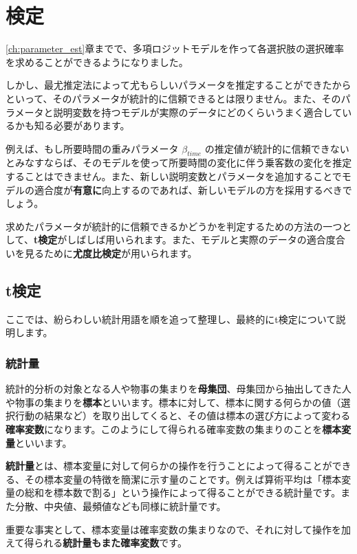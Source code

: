\chapter{検定}\label{ch:testing}

\ref{ch:parameter_est}章までで、多項ロジットモデルを作って各選択肢の選択確率を求めることができるようになりました。

しかし、最尤推定法によって尤もらしいパラメータを推定することができたからといって、そのパラメータが統計的に信頼できるとは限りません。また、そのパラメータと説明変数を持つモデルが実際のデータにどのくらいうまく適合しているかも知る必要があります。

例えば、もし所要時間の重みパラメータ $\beta_{time}$ の推定値が統計的に信頼できないとみなすならば、そのモデルを使って所要時間の変化に伴う乗客数の変化を推定することはできません。また、新しい説明変数とパラメータを追加することでモデルの適合度が\textbf{有意に}向上するのであれば、新しいモデルの方を採用するべきでしょう。

求めたパラメータが統計的に信頼できるかどうかを判定するための方法の一つとして、\textbf{t検定}がしばしば用いられます。また、モデルと実際のデータの適合度合いを見るために\textbf{尤度比検定}が用いられます。

\section{t検定}\label{sec:t_test}

ここでは、紛らわしい統計用語を順を追って整理し、最終的にt検定について説明します。

\subsection{統計量}\label{ssec:statistic}

統計的分析の対象となる人や物事の集まりを\textbf{母集団}、母集団から抽出してきた人や物事の集まりを\textbf{標本}といいます。標本に対して、標本に関する何らかの値（選択行動の結果など）を取り出してくると、その値は標本の選び方によって変わる\textbf{確率変数}になります。このようにして得られる確率変数の集まりのことを\textbf{標本変量}といいます。

\textbf{統計量}とは、標本変量に対して何らかの操作を行うことによって得ることができる、その標本変量の特徴を簡潔に示す量のことです。例えば算術平均は「標本変量の総和を標本数で割る」という操作によって得ることができる統計量です。また分散、中央値、最頻値なども同様に統計量です。

重要な事実として、標本変量は確率変数の集まりなので、それに対して操作を加えて得られる\textbf{統計量もまた確率変数}です。

